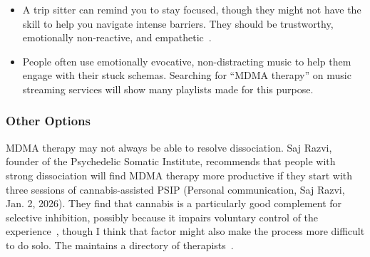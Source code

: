 \documentclass[11pt,oneside]{book}
\let\cite\parencite
\begin{document}
\begin{itemize}
    After a period of focus, and presumably reconsolidation,\footnote{\textcite{razviPSIP} doesn't frame the process in terms of reconsolidation, but I think it is clearly facilitating reconsolidation.} during which the sensations may grow and dissipate in wave patterns,\footnote{I speculate that each wave is the activation and reconsolidation of an individual schema that produces opioid dampening.} the opioid dampening recedes and transitions to flight-or-flight. Depending on the strength of opioid dampening, anywhere from minutes to a full day-long session of selective inhibition is needed.

    This is the core process in their therapeutic method called psychedelic somatic interactional psychotherapy (PSIP). I am unclear how achievable this process is in solo MDMA therapy without a practitioner skilled in the method.

    An MDMA booster dose can extend the session to deal with particularly resistant opioid dampening.
    \item A trip sitter can remind you to stay focused, though they might not have the skill to help you navigate intense barriers. They should be trustworthy, emotionally non-reactive, and empathetic~\cite{thalSitter}.
    \item People often use emotionally evocative, non-distracting music to help them engage with their stuck schemas. Searching for \enquote{MDMA therapy} on music streaming services will show many playlists made for this purpose.
\end{itemize}

\subsubsection*{Other Options}
MDMA therapy may not always be able to resolve dissociation. Saj Razvi, founder of the Psychedelic Somatic Institute, recommends that people with strong dissociation will find MDMA therapy more productive if they start with three sessions of cannabis-assisted PSIP (Personal communication, Saj Razvi, Jan. 2, 2026). They find that cannabis is a particularly good complement for selective inhibition, possibly because it impairs voluntary control of the experience~\cite{razviPSIP}, though I think that factor might also make the process more difficult to do solo. The  maintains a directory of therapists~\cite{psipDirectory}.
\end{document}

